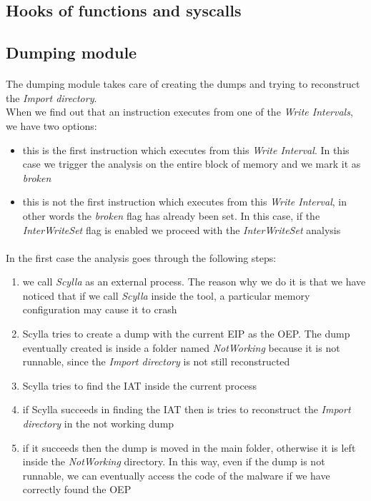 \subsection{Hooks of functions and syscalls}
\label{Hooks of functions and syscalls}

\subsection{Dumping module}
\paragraph{}
The dumping module takes care of creating the dumps and trying to reconstruct the \textit{Import directory}.\\
When we find out that an instruction executes from one of the \textit{Write Intervals}, we have two options:
\begin{itemize}
\item this is the first instruction which executes from this \textit{Write Interval}. In this case we trigger the analysis on the entire block of memory and we mark it as \textit{broken}
\item this is not the first instruction which executes from this \textit{Write Interval}, in other words the \textit{broken} flag has already been set. In this case, if the \textit{InterWriteSet} flag is enabled we proceed with the \textit{InterWriteSet} analysis
\end{itemize}
\paragraph{}
In the first case the analysis goes through the following steps:
\begin{enumerate}
\item we call \textit{Scylla} as an external process. The reason why we do it is that we have noticed that if we call \textit{Scylla} inside the tool, a particular memory configuration may cause it to crash
\item Scylla tries to create a dump with the current EIP as the OEP. The dump eventually created is inside a folder named \textit{NotWorking} because it is not runnable, since the \textit{Import directory} is not still reconstructed
\item Scylla tries to find the IAT inside the current process
\item if Scylla succeeds in finding the IAT then is tries to reconstruct the \textit{Import directory} in the not working dump
\item if it succeeds then the dump is moved in the main folder, otherwise it is left inside the \textit{NotWorking} directory. In this way, even if the dump is not runnable, we can eventually access the code of the malware if we have correctly found the OEP
\end{enumerate} 
